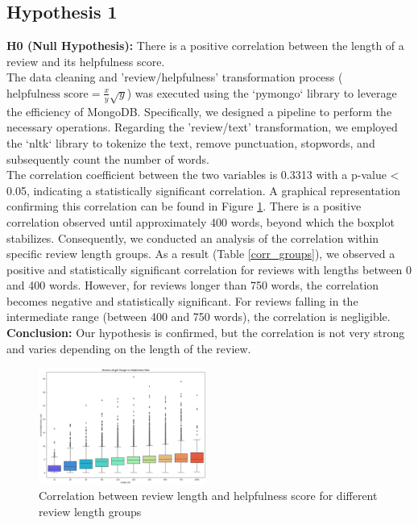\subsection*{Hypothesis 1}

\textbf{H0 (Null Hypothesis):} There is a positive correlation between the length of a review and its helpfulness score.\\
\noindent
The data cleaning and 'review/helpfulness' transformation process ($\text{helpfulness score} = \frac{x}{y} \sqrt{y}$) was executed using the `pymongo` library to leverage the efficiency of MongoDB. 
Specifically, we designed a pipeline to perform the necessary operations. Regarding the 'review/text' transformation, we employed the `nltk` 
library to tokenize the text, remove punctuation, stopwords, and subsequently count the number of words.\\
The correlation coefficient between the two variables is 0.3313 with a p-value < 0.05, indicating a statistically significant correlation.
A graphical representation confirming this correlation can be found in Figure \ref{fig:h1_boxplot}. There is a positive correlation observed until 
approximately 400 words, beyond which the boxplot stabilizes. Consequently, we conducted an analysis of the correlation within specific review length 
groups. As a result (Table \ref{corr_groups}), we observed a positive and statistically significant correlation for reviews with lengths between 0 and 400 words. 
However, for reviews longer than 750 words, the correlation becomes negative and statistically significant. For reviews falling in the intermediate range 
(between 400 and 750 words), the correlation is negligible.
\noindent
\textbf{Conclusion:} Our hypothesis is confirmed, but the correlation is not very strong and varies depending on the length of the review.

\begin{figure}[H]
    \centering
    \includegraphics[width=0.49\textwidth]{./figures/h1_boxplot.png}
    \caption{Correlation between review length and helpfulness score for different review length groups}
    \label{fig:h1_boxplot}
\end{figure}

